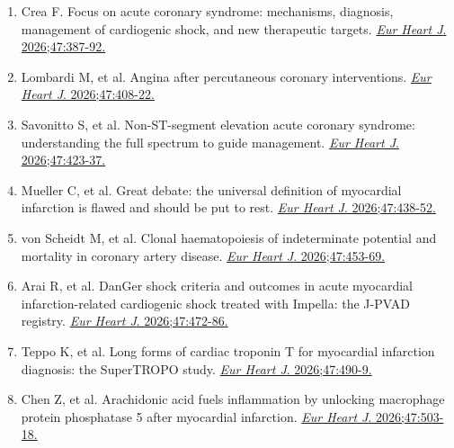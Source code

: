 \documentclass[12pt,a4paper]{article}
\begin{document}
\begin{enumerate}
    \item Crea F. Focus on acute coronary syndrome: mechanisms, diagnosis, management of cardiogenic shock, and new therapeutic targets. \href{https://doi.org/10.1093/eurheartj/ehag016}{\textit{Eur Heart J}. 2026;47:387-92.}

    \item Lombardi M, et al. Angina after percutaneous coronary interventions. \href{https://doi.org/10.1093/eurheartj/ehaf771}{\textit{Eur Heart J}. 2026;47:408-22.}

    \item Savonitto S, et al. Non-ST-segment elevation acute coronary syndrome: understanding the full spectrum to guide management. \href{https://doi.org/10.1093/eurheartj/ehaf958}{\textit{Eur Heart J}. 2026;47:423-37.}

    \item Mueller C, et al. Great debate: the universal definition of myocardial infarction is flawed and should be put to rest. \href{https://doi.org/10.1093/eurheartj/ehaf641}{\textit{Eur Heart J}. 2026;47:438-52.}

    \item von Scheidt M, et al. Clonal haematopoiesis of indeterminate potential and mortality in coronary artery disease. \href{https://doi.org/10.1093/eurheartj/ehaf602}{\textit{Eur Heart J}. 2026;47:453-69.}

    \item Arai R, et al. DanGer shock criteria and outcomes in acute myocardial infarction-related cardiogenic shock treated with Impella: the J-PVAD registry. \href{https://doi.org/10.1093/eurheartj/ehaf787}{\textit{Eur Heart J}. 2026;47:472-86.}

    \item Teppo K, et al. Long forms of cardiac troponin T for myocardial infarction diagnosis: the SuperTROPO study. \href{https://doi.org/10.1093/eurheartj/ehaf975}{\textit{Eur Heart J}. 2026;47:490-9.}

    \item Chen Z, et al. Arachidonic acid fuels inflammation by unlocking macrophage protein phosphatase 5 after myocardial infarction. \href{https://doi.org/10.1093/eurheartj/ehaf493}{\textit{Eur Heart J}. 2026;47:503-18.}
\end{enumerate}
\end{document}
